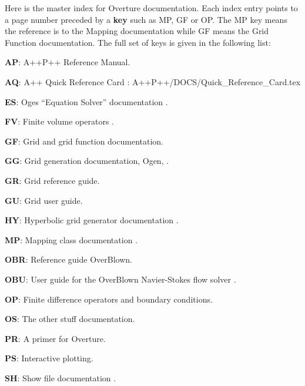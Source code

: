 \documentclass{article}
\begin{document}
Here is the master index for Overture documentation.
Each index entry points to a page number preceded by a {\bf key} such as MP, GF or OP. The
MP key means the reference is to the Mapping documentation while GF means the Grid Function documentation.
The full set of keys is given in the following list:
\begin{description}
\item {\bf AP}: A++P++ Reference Manual.
\item {\bf AQ}: A++ Quick Reference Card : {\ff A++P++/DOCS/Quick\_Reference\_Card.tex}
\item {\bf ES}: Oges ``Equation Solver'' documentation \cite{OGES}.
\item {\bf FV}: Finite volume operators \cite{FVOPERATORS}.
\item {\bf GF}: Grid and grid function documentation\cite{GF}.
\item {\bf GG}: Grid generation documentation, Ogen,  \cite{OGEN}. 
\item {\bf GR}: Grid reference guide\cite{gridRef}.
\item {\bf GU}: Grid user guide\cite{gridGuide}.
\item {\bf HY}: Hyperbolic grid generator documentation \cite{HyperbolicGuide}.
\item {\bf MP}: Mapping class documentation \cite{MAPPINGS}.
\item {\bf OBR}: Reference guide OverBlown\cite{OverBlownReferenceGuide}.
\item {\bf OBU}: User guide for the OverBlown Navier-Stokes flow solver \cite{OverBlownUserGuide}.
\item {\bf OP}: Finite difference operators and boundary conditions\cite{OPERATORS}.
\item {\bf OS}: The other stuff documentation\cite{OTHERSTUFF}.
\item {\bf PR}: A primer for Overture\cite{PRIMER}.
\item {\bf PS}: Interactive plotting\cite{PLOTSTUFF}.
\item {\bf SH}: Show file documentation \cite{OGSHOW}.
\end{description}

% 
% 
\end{document}
